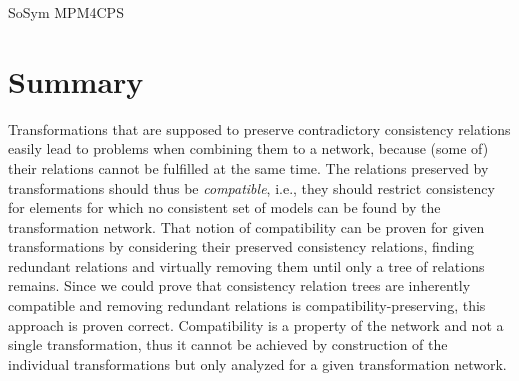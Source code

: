 \begin{copiedFrom}{SoSym MPM4CPS}

\end{copiedFrom} %




\section{Summary}

\begin{insight}[Compatibility]
    Transformations that are supposed to preserve contradictory consistency relations easily lead to problems when combining them to a network, because (some of) their relations cannot be fulfilled at the same time.
    The relations preserved by transformations should thus be \emph{compatible}, i.e., they should restrict consistency for elements for which no consistent set of models can be found by the transformation network.
    That notion of compatibility can be proven for given transformations by considering their preserved consistency relations, finding redundant relations and virtually removing them until only a tree of relations remains. Since we could prove that consistency relation trees are inherently compatible and removing redundant relations is compatibility-preserving, this approach is proven correct.
    Compatibility is a property of the network and not a single transformation, thus it cannot be achieved by construction of the individual transformations but only analyzed for a given transformation network.
\end{insight}

